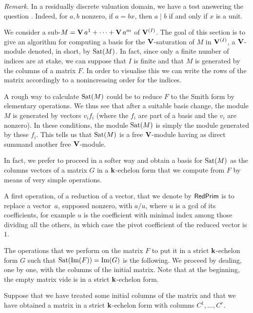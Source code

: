 \medskip  \noindent \textsl{Remark.}
In a residually discrete valuation domain, we have a  test answering the question
 . Indeed, for $a,b$ nonzero, if $a=bx$, then $a\mid b$ if and only if $x$ is a unit.



\medskip
We consider a sub-\Vmo $M=\mathbf{V} \,a^1+\cdots+\mathbf{V} \, a^m$ of $\mathbf{V}^{(I)}$.
The goal of this section is to give an algorithm for computing a basis for the  $\mathbf{V}$-saturation of $M$ in $\mathbf{V}^{(I)}$, a $\mathbf{V}$-module denoted, in short, by
$\mathrm{Sat}(M)$.
In fact, since only a finite number of indices are at stake, we can suppose that $I$ is finite and that $M$ is generated by the columns of a matrix $F$.
In order to visualise this we can write the  rows of the matrix accordingly to a nonincreasing order for the indices.

A rough way to  calculate $\mathrm{Sat}(M)$ could be to reduce  $F$
to the  Smith form by elementary operations. We thus see that after a suitable basis change, the module $M$
is generated by   vectors $v_if_i$ (where the $f_i$ are part of a basis and the $v_i$ are nonzero). In these conditions, the module $\mathrm{Sat}(M)$
is simply the module generated by these  $f_i$.
This tells us that $\mathrm{Sat}(M)$  is a free $\mathbf{V}$-module having as  direct summand another
free $\mathbf{V}$-module.

\smallskip
 In fact, we prefer to proceed in a softer way and obtain a basis for   $\mathrm{Sat}(M)$ as the columns vectors of a matrix $G$ in a
 $\mathbf{k}$-echelon form that we compute from   $F$ by means of very simple operations.

A first operation, of a reduction of a vector, that we denote by
$\mathsf{RedPrim}$ is to replace a vector~$a$, supposed nonzero, with
$a/u$, where $u$ is a gcd of its coefficients, for example $u$ is the coefficient with minimal index among those dividing all the others, in which case the  pivot coefficient of the reduced  vector is $1$.


The operations that we perform on the  matrix $F$ to put it in a strict
$\mathbf{k}$-echelon form $G$
such that $\mathrm{Sat}(\mathrm{Im}(F))= \mathrm{Im}(G)$  is the following. We proceed by dealing, one by one, with the columns of the initial matrix.
Note that at the beginning, the  empty matrix vide is in a strict $\mathbf{k}$-echelon form.

Suppose that we have treated some initial columns of the matrix and that we have obtained a matrix in a strict $\mathbf{k}$-echelon form with columns
$C^1,\dots,C^r$.

